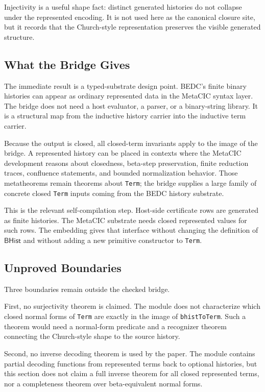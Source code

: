 Injectivity is a useful shape fact: distinct generated histories do not
collapse under the represented encoding. It is not used here as the canonical
closure site, but it records that the Church-style representation preserves
the visible generated structure.

\subsection{What the Bridge Gives}
\label{subsec:bhist-substrate-gives}

The immediate result is a typed-substrate design point. BEDC's finite binary
histories can appear as ordinary represented data in the MetaCIC syntax layer.
The bridge does not need a host evaluator, a parser, or a binary-string
library. It is a structural map from the inductive history carrier into the
inductive term carrier.

Because the output is closed, all closed-term invariants apply to the image
of the bridge. A represented history can be placed in contexts where the
MetaCIC development reasons about closedness, beta-step preservation, finite
reduction traces, confluence statements, and bounded normalization behavior.
Those metatheorems remain theorems about \texttt{Term}; the bridge supplies a
large family of concrete closed \texttt{Term} inputs coming from the BEDC
history substrate.

This is the relevant self-compilation step. Host-side certificate rows are
generated as finite histories. The MetaCIC substrate needs closed represented
values for such rows. The embedding gives that interface without changing the
definition of $\mathsf{BHist}$ and without adding a new primitive constructor
to \texttt{Term}.

\subsection{Unproved Boundaries}
\label{subsec:bhist-substrate-unproved-boundaries}

Three boundaries remain outside the checked bridge.

First, no surjectivity theorem is claimed. The module does not characterize
which closed normal forms of \texttt{Term} are exactly in the image of
\texttt{bhistToTerm}. Such a theorem would need a normal-form predicate and a
recognizer theorem connecting the Church-style shape to the source history.

Second, no inverse decoding theorem is used by the paper. The module contains
partial decoding functions from represented terms back to optional histories,
but this section does not claim a full inverse theorem for all closed
represented terms, nor a completeness theorem over beta-equivalent normal
forms.

